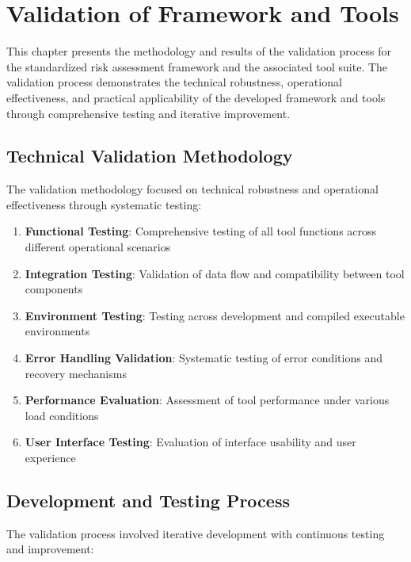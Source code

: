 \documentclass[binding=0.6cm]{sapthesis}
\begin{document}
\chapter{Validation of Framework and Tools}
\label{ch:validation}

This chapter presents the methodology and results of the validation process for the standardized risk assessment framework and the associated tool suite. The validation process demonstrates the technical robustness, operational effectiveness, and practical applicability of the developed framework and tools through comprehensive testing and iterative improvement.

\section{Technical Validation Methodology}

The validation methodology focused on technical robustness and operational effectiveness through systematic testing:

\begin{enumerate}
    \item \textbf{Functional Testing}: Comprehensive testing of all tool functions across different operational scenarios
    \item \textbf{Integration Testing}: Validation of data flow and compatibility between tool components
    \item \textbf{Environment Testing}: Testing across development and compiled executable environments
    \item \textbf{Error Handling Validation}: Systematic testing of error conditions and recovery mechanisms
    \item \textbf{Performance Evaluation}: Assessment of tool performance under various load conditions
    \item \textbf{User Interface Testing}: Evaluation of interface usability and user experience
\end{enumerate}

\section{Development and Testing Process}

The validation process involved iterative development with continuous testing and improvement:
\end{document}
